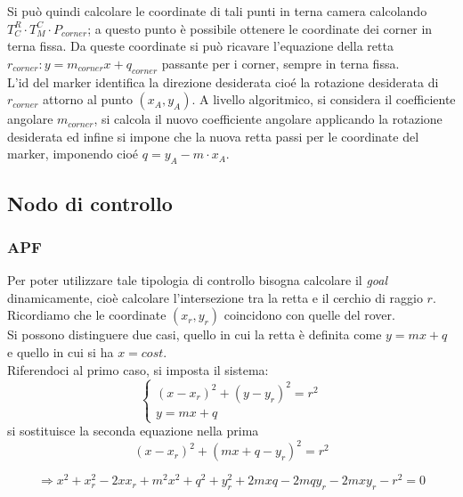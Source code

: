   Si può quindi calcolare le coordinate di tali punti in terna camera calcolando $T^R_C \cdot T^C_M \cdot P_{corner}$; a questo punto è possibile ottenere le coordinate
  dei corner in terna fissa. Da queste coordinate si può ricavare l'equazione della retta $r_{corner}: y = m_{corner} x + q_{corner}$ passante per i corner, sempre in 
  terna fissa. \\
  L'id del marker identifica la direzione desiderata cioé la rotazione desiderata di $r_{corner}$ attorno al punto $(x_A, y_A)$. A livello algoritmico, si considera
  il coefficiente angolare $m_{corner}$, si calcola il nuovo coefficiente angolare applicando la rotazione desiderata ed infine si impone che la nuova retta 
  passi per le coordinate del marker, imponendo cioé $q = y_A - m \cdot x_A$.
  
\subsection{Nodo di controllo}
\subsubsection{APF}
Per poter utilizzare tale tipologia di controllo bisogna calcolare il \textit{goal} dinamicamente, cioè calcolare l'intersezione tra la retta e il cerchio di raggio $r$. Ricordiamo che le coordinate $(x_r,y_r)$ coincidono con quelle del rover. \\
Si possono distinguere due casi, quello in cui la retta è definita come $y=mx+q$ e quello in cui si ha $x=cost$.\\
Riferendoci al primo caso, si imposta il sistema:
\begin{equation} 
\begin{cases}

    (x-x_r)^2+(y-y_r)^2=r^2
   \\
    y=mx+q 
  \end{cases} 
\end{equation}
si sostituisce la seconda equazione nella prima
\begin{equation*}
(x-x_r)^2+(mx+q-y_r)^2=r^2
\end{equation*}

\begin{equation}
\Rightarrow x^2+x_r^2-2xx_r+m^2x^2+q^2+y_r^2+2mxq-2mqy_r-2mxy_r-r^2=0
\end{equation}

